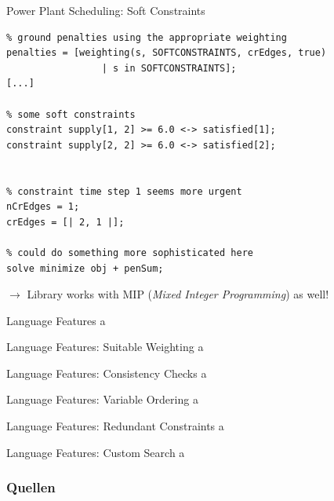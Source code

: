 \documentclass[handout,10pt,xcolor={dvipsnames},fleqn]{beamer}
\begin{document}
\begin{frame}[fragile]{Power Plant Scheduling: Soft Constraints}
\begin{lstlisting}
% ground penalties using the appropriate weighting
penalties = [weighting(s, SOFTCONSTRAINTS, crEdges, true) 
                 | s in SOFTCONSTRAINTS];
[...]

% some soft constraints
constraint supply[1, 2] >= 6.0 <-> satisfied[1]; 
constraint supply[2, 2] >= 6.0 <-> satisfied[2]; 


% constraint time step 1 seems more urgent
nCrEdges = 1;
crEdges = [| 2, 1 |];

% could do something more sophisticated here
solve minimize obj + penSum;
\end{lstlisting}
$\rightarrow$ Library works with MIP (\emph{Mixed Integer Programming}) as well!
\end{frame}


\begin{frame}{Language Features}
a
\end{frame}

\begin{frame}{Language Features: Suitable Weighting}
a
\end{frame}

\begin{frame}{Language Features: Consistency Checks}
a
\end{frame}

\begin{frame}{Language Features: Variable Ordering}
a
\end{frame}

\begin{frame}{Language Features: Redundant Constraints}
a
\end{frame}

\begin{frame}{Language Features: Custom Search}
a
\end{frame}


\begin{frame}[allowframebreaks]
        \frametitle{Quellen}
        
        
\end{frame}
\end{document}
